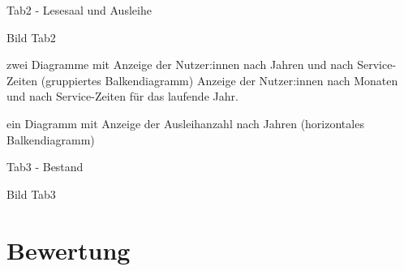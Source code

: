     
    
    
    
    Tab2 - Lesesaal und Ausleihe
    
    Bild Tab2
    
    zwei Diagramme mit
        Anzeige der Nutzer:innen nach Jahren und nach Service-Zeiten (gruppiertes Balkendiagramm)
        Anzeige der Nutzer:innen nach Monaten und nach Service-Zeiten für das laufende Jahr.
        
     ein Diagramm mit
        Anzeige der Ausleihanzahl nach Jahren (horizontales Balkendiagramm)
    
    Tab3 - Bestand
    
    Bild Tab3

    
     



\section{Bewertung}
